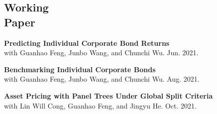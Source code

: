 \documentclass[margin]{res}
\begin{document}
\begin{resume}
		\vspace{5mm}
		
		\section{\sc Working \\ Paper}
		
		\textbf{Predicting Individual Corporate Bond Returns \\}
		with Guanhao Feng, Junbo Wang, and Chunchi Wu. Jun. 2021.
		
		\textbf{Benchmarking Individual Corporate Bonds \\}
		with Guanhao Feng, Junbo Wang, and Chunchi Wu.  Aug. 2021.
		
		\textbf{Asset Pricing with Panel Trees Under Global Split Criteria \\}
		with Lin Will Cong, Guanhao Feng, and Jingyu He. Oct. 2021. 
		
		\vspace{5mm}
		
		
		
		
		
		
		

\end{resume}
\end{document}
